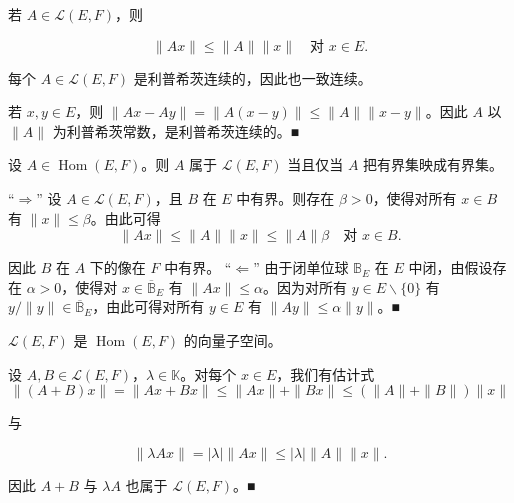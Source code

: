 \begin{conclusion}

\begin{items}
\item

若 $ A \in \mathcal{L}(E, F) $，则

\[
\|Ax\| \le \|A\| \|x\| \quad \text{对 } x \in E.
\]
\item

每个 $ A \in \mathcal{L}(E, F) $ 是利普希茨连续的，因此也一致连续。

\proofhead
若 $ x, y \in E $，则 $ \|Ax - Ay\| = \|A(x - y)\| \le \|A\| \|x - y\| $。因此 $ A $ 以 $ \|A\| $ 为利普希茨常数，是利普希茨连续的。\nobreak\hspace{0.35em}■
\item

设 $ A \in \operatorname{Hom}(E, F) $。则 $ A $ 属于 $ \mathcal{L}(E, F) $ 当且仅当 $ A $ 把有界集映成有界集。

\proofhead
“$ \Longrightarrow $” 设 $ A \in \mathcal{L}(E, F) $，且 $ B $ 在 $ E $ 中有界。则存在 $ \beta > 0 $，使得对所有 $ x \in B $ 有 $ \|x\| \le \beta $。由此可得
\[
\|Ax\| \le \|A\| \|x\| \le \|A\| \beta \quad \text{对 } x \in B.
\]

因此 $ B $ 在 $ A $ 下的像在 $ F $ 中有界。
“$ \Longleftarrow $” 由于闭单位球 $ \mathbb{B}_E $ 在 $ E $ 中闭，由假设存在 $ \alpha > 0 $，使得对 $ x \in \overline{\mathbb{B}}_E $ 有 $ \|Ax\| \le \alpha $。因为对所有 $ y \in E \backslash \{0\} $ 有 $ y/\|y\| \in \overline{\mathbb{B}}_E $，由此可得对所有 $ y \in E $ 有 $ \|Ay\| \le \alpha \|y\| $。\nobreak\hspace{0.35em}■

\item

$ \mathcal{L}(E, F) $ 是 $ \operatorname{Hom}(E, F) $ 的向量子空间。

\proofhead
设 $ A, B \in \mathcal{L}(E, F) $，$ \lambda \in \mathbb{K} $。对每个 $ x \in E $，我们有估计式
\begin{equation}
\|(A + B)x\| = \|Ax + Bx\| \le \|Ax\| + \|Bx\| \le (\|A\| + \|B\|) \|x\|\tag{2.6}
\end{equation}

与

\begin{equation}
\|\lambda Ax\| = |\lambda| \|Ax\| \le |\lambda| \|A\| \|x\|.\tag{2.7}
\end{equation}

因此 $ A + B $ 与 $ \lambda A $ 也属于 $ \mathcal{L}(E, F) $。\nobreak\hspace{0.35em}■


\end{items}
\end{conclusion}
